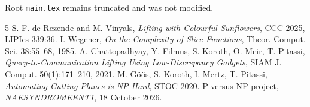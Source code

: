 \documentclass[11pt]{article}
\begin{document}
Root \texttt{main.tex} remains truncated and was not modified.

\begin{thebibliography}{5}
 S. F. de Rezende and M. Vinyals, \emph{Lifting with Colourful Sunflowers}, CCC 2025, LIPIcs 339:36.
 I. Wegener, \emph{On the Complexity of Slice Functions}, Theor. Comput. Sci. 38:55--68, 1985.
 A. Chattopadhyay, Y. Filmus, S. Koroth, O. Meir, T. Pitassi, \emph{Query-to-Communication Lifting Using Low-Discrepancy Gadgets}, SIAM J. Comput. 50(1):171--210, 2021.
 M. G\"o\"os, S. Koroth, I. Mertz, T. Pitassi, \emph{Automating Cutting Planes is NP-Hard}, STOC 2020.
 P versus NP project, \emph{NAESYNDROMEENT1}, 18 October 2026.
\end{thebibliography}
\end{document}
